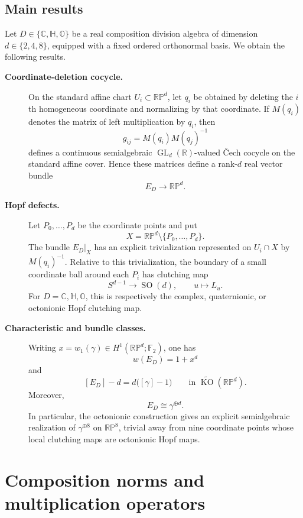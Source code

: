 \documentclass[12pt]{article}
\theoremstyle{plain}
\theoremstyle{definition}
\newcommand{\F}{\mathbb F}
\newcommand{\R}{\mathbb R}
\newcommand{\C}{\mathbb C}
\newcommand{\Hh}{\mathbb H}
\newcommand{\Oct}{\mathbb O}
\newcommand{\RP}{\mathbb{RP}}
\newcommand{\GL}{\operatorname{GL}}
\newcommand{\SO}{\operatorname{SO}}
\newcommand{\KO}{\operatorname{KO}}
\begin{document}
\subsection*{Main results}

Let \(D\in\{\C,\Hh,\Oct\}\) be a real composition division algebra of
dimension \(d\in\{2,4,8\}\), equipped with a fixed ordered orthonormal
basis.  We obtain the following results.

\begin{description}
	
	\item[\textbf{Coordinate-deletion cocycle.}]
	On the standard affine chart \(U_i\subset\RP^d\), let \(q_i\) be obtained
	by deleting the \(i\)th homogeneous coordinate and normalizing by that
	coordinate.  If \(M(q_i)\) denotes the matrix of left multiplication by
	\(q_i\), then
	\[
	g_{ij}=M(q_i)M(q_j)^{-1}
	\]
	defines a continuous semialgebraic \(\GL_d(\R)\)-valued \v{C}ech cocycle
	on the standard affine cover.  Hence these matrices define a rank-\(d\)
	real vector bundle
	\[
	E_D\longrightarrow\RP^d.
	\]
	
	\item[\textbf{Hopf defects.}]
	Let \(P_0,\ldots,P_d\) be the coordinate points and put
	\[
	X=\RP^d\setminus\{P_0,\ldots,P_d\}.
	\]
	The bundle \(E_D|_X\) has an explicit trivialization represented on
	\(U_i\cap X\) by \(M(q_i)^{-1}\).  Relative to this trivialization, the
	boundary of a small coordinate ball around each \(P_i\) has clutching map
	\[
	S^{d-1}\longrightarrow\SO(d),\qquad u\longmapsto L_u.
	\]
	For \(D=\C,\Hh,\Oct\), this is respectively the complex, quaternionic,
	or octonionic Hopf clutching map.
	
	\item[\textbf{Characteristic and bundle classes.}]
	Writing \(x=w_1(\gamma)\in H^1(\RP^d;\F_2)\), one has
	\[
	w(E_D)=1+x^d
	\]
	and
	\[
	[E_D]-d=d\bigl([\gamma]-1\bigr)
	\qquad\text{in }\widetilde{\KO}(\RP^d).
	\]
	Moreover,
	\[
	E_D\cong\gamma^{\oplus d}.
	\]
	In particular, the octonionic construction gives an explicit
	semialgebraic realization of \(\gamma^{\oplus8}\) on \(\RP^8\), trivial
	away from nine coordinate points whose local clutching maps are
	octonionic Hopf maps.
	
\end{description}

\section{Composition norms and multiplication operators}
\label{sec:composition}
\end{document}
